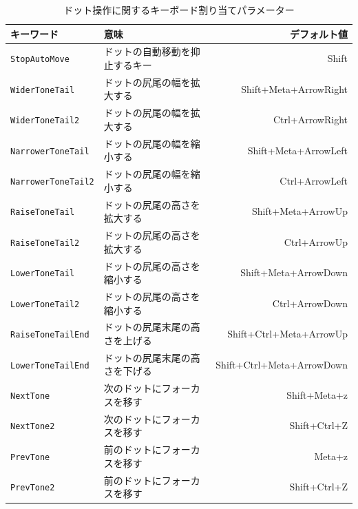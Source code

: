 \begin{table}[h]\label{DotOperationParameters}
	\centering
	\caption{ドット操作に関するキーボード割り当てパラメーター}
	\smallskip
	\begin{tabular}{llr}
	\hline
	キーワード & 意味 & デフォルト値\\
	\hline
	\hline
	\texttt{StopAutoMove} & ドットの自動移動を抑止するキー & Shift\\
	\hline
	\texttt{WiderToneTail} & ドットの尻尾の幅を拡大する
	 & Shift+Meta+ArrowRight\\
	\hline
	\texttt{WiderToneTail2} & ドットの尻尾の幅を拡大する
	 & Ctrl+ArrowRight\\
	\hline
	\texttt{NarrowerToneTail} & ドットの尻尾の幅を縮小する
	 & Shift+Meta+ArrowLeft\\
	\hline
	\texttt{NarrowerToneTail2} & ドットの尻尾の幅を縮小する
	 & Ctrl+ArrowLeft\\
	\hline
	\texttt{RaiseToneTail} & ドットの尻尾の高さを拡大する
	 & Shift+Meta+ArrowUp\\
	\hline
	\texttt{RaiseToneTail2} & ドットの尻尾の高さを拡大する
	 & Ctrl+ArrowUp\\
	\hline
	\texttt{LowerToneTail} & ドットの尻尾の高さを縮小する
	 & Shift+Meta+ArrowDown\\
	\hline
	\texttt{LowerToneTail2} & ドットの尻尾の高さを縮小する
	 & Ctrl+ArrowDown\\
	\hline
	\texttt{RaiseToneTailEnd} & ドットの尻尾末尾の高さを上げる
	 & Shift+Ctrl+Meta+ArrowUp\\
	\hline
	\texttt{LowerToneTailEnd} & ドットの尻尾末尾の高さを下げる
	 & Shift+Ctrl+Meta+ArrowDown\\
	\hline
	\texttt{NextTone} & 次のドットにフォーカスを移す
	 & Shift+Meta+z\\
	\hline
	\texttt{NextTone2} & 次のドットにフォーカスを移す
	 & Shift+Ctrl+Z\\
	\hline
	\texttt{PrevTone} & 前のドットにフォーカスを移す
	 & Meta+z\\
	\hline
	\texttt{PrevTone2} & 前のドットにフォーカスを移す
	 & Shift+Ctrl+Z\\
	\hline
	\end{tabular}
\end{table}
